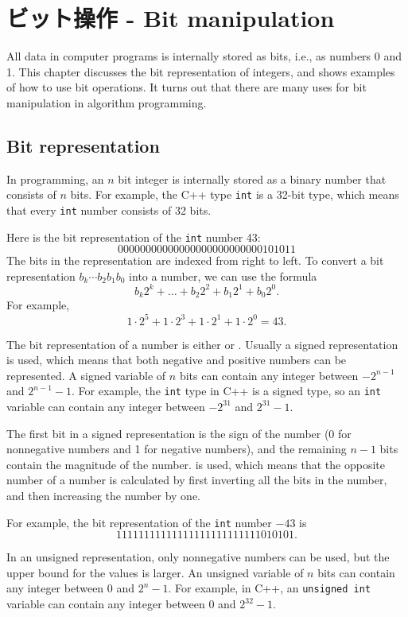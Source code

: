 \chapter{ビット操作 - Bit manipulation}

All data in computer programs is internally stored as bits,
i.e., as numbers 0 and 1.
This chapter discusses the bit representation
of integers, and shows examples
of how to use bit operations.
It turns out that there are many uses for
bit manipulation in algorithm programming.

\section{Bit representation}


In programming, an $n$ bit integer is internally
stored as a binary number that consists of $n$ bits.
For example, the C++ type \texttt{int} is
a 32-bit type, which means that every \texttt{int}
number consists of 32 bits.

Here is the bit representation of
the \texttt{int} number 43: 
\[00000000000000000000000000101011\]
The bits in the representation are indexed from right to left.
To convert a bit representation $b_k \cdots b_2 b_1 b_0$ into a number,
we can use the formula
\[b_k 2^k + \ldots + b_2 2^2 + b_1 2^1 + b_0 2^0.\]
For example,
\[1 \cdot 2^5 + 1 \cdot 2^3 + 1 \cdot 2^1 + 1 \cdot 2^0 = 43.\]

The bit representation of a number is either
 or .
Usually a signed representation is used,
which means that both negative and positive
numbers can be represented.
A signed variable of $n$ bits can contain any
integer between $-2^{n-1}$ and $2^{n-1}-1$.
For example, the \texttt{int} type in C++ is
a signed type, so an \texttt{int} variable can contain any
integer between $-2^{31}$ and $2^{31}-1$.

The first bit in a signed representation
is the sign of the number (0 for nonnegative numbers
and 1 for negative numbers), and
the remaining $n-1$ bits contain the magnitude of the number.
 is used, which means that the
opposite number of a number is calculated by first
inverting all the bits in the number,
and then increasing the number by one.

For example, the bit representation of
the \texttt{int} number $-43$ is
\[11111111111111111111111111010101.\]

In an unsigned representation, only nonnegative
numbers can be used, but the upper bound for the values is larger.
An unsigned variable of $n$ bits can contain any
integer between $0$ and $2^n-1$.
For example, in C++, an \texttt{unsigned int} variable
can contain any integer between $0$ and $2^{32}-1$.

